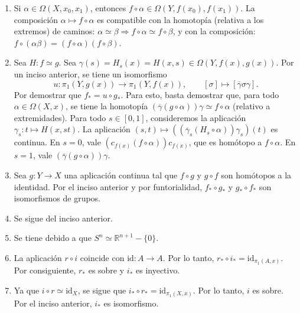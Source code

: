 \documentclass[11pt,a4paper]{article}
\theoremstyle{plain}
\theoremstyle{definition}
\theoremstyle{remark}
\newcommand{\RR}{\mathbb R}
\begin{document}
\begin{enumerate}[label=\arabic*.,leftmargin=*]
\begin{enumerate}[label=\alph*)]
$\Phi$ es inyectiva. Supongamos que $\alpha\in\Omega(X\times Y,(x_0,y_0))$
tal que $\Phi([\alpha])=([c_{x_0}],[c_{y_0}])$. Esto significa que
$G:p\circ\alpha\simeq c_{x_0}$ y $H:q\circ\alpha\simeq c_{y_0}$. Entonces,
defínase
\[
F:I\times I\to X\times Y, \qquad (s,t)\mapsto(G(s,t),H(s,t)).
\]
Se cumple que $F(s,0)=(p\circ\alpha,q\circ\alpha)$, $F(s,1)=(c_{x_0},c_{y_0})=e_{(x_0,y_0)}$
y $F(0,t)=F(1,t)=(x_0,y_0)$. Por lo tanto, $F:\alpha\simeq c_{(x_0,y_0)}$.
\item Si $\alpha\in\Omega(X,x_0,x_1)$, entonces $f\circ\alpha\in\Omega(Y,f(x_0),f(x_1))$.
La composición $\alpha\mapsto f\circ\alpha$ es compatible con la homotopía
(relativa a los extremos) de caminos: $\alpha\simeq\beta\Rightarrow
f\circ\alpha\simeq f\circ\beta$, y con la composición:
$f\circ(\alpha\beta)=(f\circ\alpha)(f\circ\beta)$.
\item Sea $H:f\simeq g$. Sea $\gamma(s)=H_s(x)=H(x,s)\in\Omega(Y,f(x),g(x))$.
Por un inciso anterior, se tiene un isomorfismo
\[
u:\pi_1(Y,g(x))\to\pi_1(Y,f(x)), \qquad [\sigma]\mapsto[\overline\gamma\sigma\gamma].
\]
Por demostrar que $f_*=u\circ g_*$. Para esto, basta demostrar que, para
todo $\alpha\in\Omega(X,x)$, se tiene la homotopía
$(\overline\gamma(g\circ\alpha))\gamma\simeq f\circ\alpha$ (relativo a
extremidades). Para todo $s\in[0,1]$, consideremos la aplicación
$\gamma_s:t\mapsto H(x,st)$. La aplicación
$(s,t)\mapsto((\overline\gamma_s(H_s\circ\alpha))\gamma_s)(t)$ es continua.
En $s=0$, vale $(c_{f(x)}(f\circ\alpha))c_{f(x)}$, que es homótopo a
$f\circ\alpha$. En $s=1$, vale $(\overline\gamma(g\circ\alpha))\gamma$.
\item Sea $g:Y\to X$ una aplicación continua tal que $f\circ g$ y $g\circ f$
son homótopos a la identidad. Por el inciso anterior y por funtorialidad,
$f_*\circ g_*$ y $g_*\circ f_*$ son isomorfismos de grupos.
\item Se sigue del inciso anterior.
\item Se tiene debido a que $S^n\simeq\RR^{n+1}-\{0\}$.
\item La aplicación $r\circ i$ coincide con $\mathrm{id}:A\to A$. Por lo
tanto, $r_*\circ i_*=\mathrm{id}_{\pi_1(A,x)}$. Por consiguiente, $r_*$ es
sobre y $i_*$ es inyectivo.
\item Ya que $i\circ r\simeq\mathrm{id}_X$, se sigue que
$i_*\circ r_*=\mathrm{id}_{\pi_1(X,x)}$. Por lo tanto, $i$ es sobre. Por el
inciso anterior, $i_*$ es isomorfismo.
\end{enumerate}


\end{enumerate}
\end{document}
